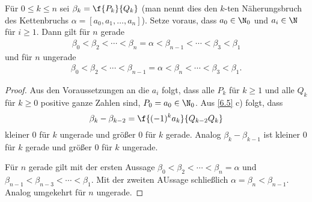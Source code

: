 \begin{kor} \label{6.6}
	Für $0 \le k \le n$ sei $\beta_k = \f {P_k}{Q_k}$ (man nennt dies den $k$-ten Näherungsbruch des Kettenbruchs $\alpha = [a_0, a_1, \dotsc, a_n]$).
	Setze voraus, dass $a_0 \in \N_0$ und $a_i \in \N$ für $i \ge 1$.
	Dann gilt für $n$ gerade
	\begin{align*}
		\beta_0 < \beta_2 < \dotsb < \beta_n = \alpha < \beta_{n-1} < \dotsb < \beta_3 < \beta_1
	\end{align*}
	und für $n$ ungerade
	\begin{align*}
		\beta_0 < \beta_2 < \dotsb < \beta_{n-1} = \alpha < \beta_n < \dotsb < \beta_3 < \beta_1.
	\end{align*}
	\begin{proof}
		Aus den Voraussetzungen an die $a_i$ folgt, dass alle $P_k$ für $k \ge 1$ und alle $Q_k$ für $k \ge 0$ positive ganze Zahlen sind, $P_0 = a_0 \in \N_0$.
		Aus \ref{6.5} c) folgt, dass
		\[
			\beta_k - \beta_{k-2}
			= \f {(-1)^k a_k}{Q_{k-2}Q_k}
		\]
		kleiner $0$ für $k$ ungerade und größer $0$ für $k$ gerade.
		Analog $\beta_k - \beta_{k-1}$ ist kleiner $0$ für $k$ gerade und größer $0$ für $k$ ungerade.

		Für $n$ gerade gilt mit der ersten Aussage $\beta_0 < \beta_2 < \dotsb  < \beta_n = \alpha$ und $\beta_{n-1} < \beta_{n-3} < \dotsb < \beta_1$.
		Mit der zweiten AUssage schließlich $\alpha = \beta_n < \beta_{n-1}$.
		Analog umgekehrt für $n$ ungerade.
	\end{proof}
\end{kor}

